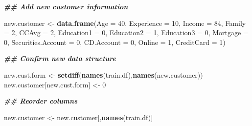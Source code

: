 \documentclass[
]{article}
\newenvironment{Shaded}{\begin{snugshade}}{\end{snugshade}}
\newcommand{\AttributeTok}[1]{\textcolor[rgb]{0.13,0.29,0.53}{#1}}
\newcommand{\DecValTok}[1]{\textcolor[rgb]{0.00,0.00,0.81}{#1}}
\newcommand{\DocumentationTok}[1]{\textcolor[rgb]{0.56,0.35,0.01}{\textbf{\textit{#1}}}}
\newcommand{\FunctionTok}[1]{\textcolor[rgb]{0.13,0.29,0.53}{\textbf{#1}}}
\newcommand{\NormalTok}[1]{#1}
\newcommand{\OtherTok}[1]{\textcolor[rgb]{0.56,0.35,0.01}{#1}}
\begin{document}
\begin{Shaded}
\begin{Highlighting}[]
\DocumentationTok{\#\# Add new customer information}

\NormalTok{new.customer }\OtherTok{\textless{}{-}} \FunctionTok{data.frame}\NormalTok{(}\AttributeTok{Age =} \DecValTok{40}\NormalTok{, }\AttributeTok{Experience =} \DecValTok{10}\NormalTok{, }\AttributeTok{Income =} \DecValTok{84}\NormalTok{, }\AttributeTok{Family =} \DecValTok{2}\NormalTok{, }\AttributeTok{CCAvg =} \DecValTok{2}\NormalTok{, }\AttributeTok{Education1 =} \DecValTok{0}\NormalTok{, }\AttributeTok{Education2 =} \DecValTok{1}\NormalTok{, }\AttributeTok{Education3 =} \DecValTok{0}\NormalTok{, }\AttributeTok{Mortgage =} \DecValTok{0}\NormalTok{, }\AttributeTok{Securities.Account =} \DecValTok{0}\NormalTok{, }\AttributeTok{CD.Account =} \DecValTok{0}\NormalTok{, }\AttributeTok{Online =} \DecValTok{1}\NormalTok{, }\AttributeTok{CreditCard =} \DecValTok{1}\NormalTok{)}

\DocumentationTok{\#\# Confirm new data structure}

\NormalTok{new.cust.form }\OtherTok{\textless{}{-}} \FunctionTok{setdiff}\NormalTok{(}\FunctionTok{names}\NormalTok{(train.df),}\FunctionTok{names}\NormalTok{(new.customer))}
\NormalTok{new.customer[new.cust.form] }\OtherTok{\textless{}{-}} \DecValTok{0}

\DocumentationTok{\#\# Reorder columns}

\NormalTok{new.customer }\OtherTok{\textless{}{-}}\NormalTok{ new.customer[,}\FunctionTok{names}\NormalTok{(train.df)]}
\end{Highlighting}
\end{Shaded}
\end{document}
